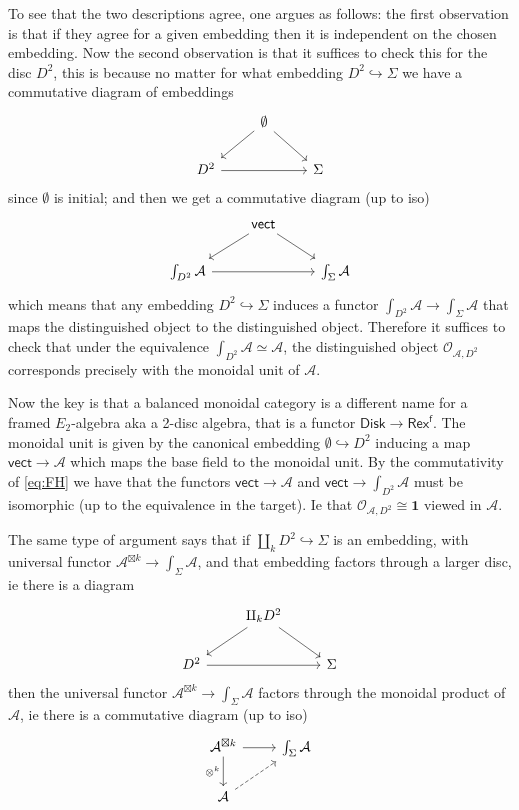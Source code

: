 \documentclass[11pt]{article}
\newcommand{\Rexf}{\mathsf{Rex}^{\mathsf{f}}}
\newcommand{\cA}{\mathcal{A}}
\theoremstyle{definition}
\begin{document}
To see that the two descriptions agree, one argues as follows: the first observation is that if they agree for a given embedding then it is independent on the chosen embedding. Now the second observation is that it suffices to check this for the disc $D^2$, this is because no matter for what embedding $D^2 \hookrightarrow \Sigma$ we have a commutative diagram of embeddings
$$\begin{tikzcd}
  &  \emptyset \arrow{dl} \arrow{dr} & \\
  D^2 \arrow{rr} & & \Sigma
\end{tikzcd}$$
since $\emptyset$ is initial; and then we get a commutative diagram (up to iso)
$$\begin{tikzcd}
  &  \mathsf{vect} \arrow{dl} \arrow{dr} & \\
  \int_{D^2} \cA  \arrow{rr} & & \int_\Sigma \cA
\end{tikzcd}$$
which means that any embedding $D^2 \hookrightarrow \Sigma$ induces a functor $\int_{D^2} \cA \to \int_\Sigma \cA$ that maps the distinguished object to the distinguished object. Therefore it suffices to check that under the equivalence $\int_{D^2} \cA \simeq \cA$, the distinguished object $\mathcal{O}_{\cA,D^2}$ corresponds precisely with the monoidal unit of $\cA$.

Now the key is that a balanced monoidal category is a different name for a framed $E_2$-algebra aka a 2-disc algebra, that is a functor $\mathsf{Disk} \to \Rexf$. The monoidal unit is given by the canonical embedding $\emptyset \hookrightarrow D^2$ inducing a map $\mathsf{vect}\to \cA$ which maps the base field to the monoidal unit. By the commutativity of \eqref{eq:FH} we have that the functors $\mathsf{vect}\to \cA$ and $\mathsf{vect}\to \int_{D^2} \cA$ must be isomorphic (up to the equivalence in the target). Ie that $\mathcal{O}_{\cA,D^2} \cong \mathbf{1}$ viewed in $\cA$.



The same type of argument says that if $\amalg_k D^2 \hookrightarrow \Sigma$ is an embedding, with universal functor $\cA^{\boxtimes k} \to \int_\Sigma \cA$, and that embedding factors through a larger disc, ie there is a diagram 
$$\begin{tikzcd}
  &  \amalg_k D^2 \arrow{dl} \arrow{dr} & \\
  D^2 \arrow{rr} & & \Sigma
\end{tikzcd}$$
then the universal functor $\cA^{\boxtimes k} \to \int_\Sigma \cA$ factors through the monoidal product of $\cA$, ie there is  a commutative diagram (up to iso)
$$\begin{tikzcd}
    \cA^{\boxtimes k}  \rar \dar[swap]{\otimes^k} &  \int_\Sigma \cA \\
    \cA \arrow[dashed]{ur} &
\end{tikzcd}$$
\end{document}
